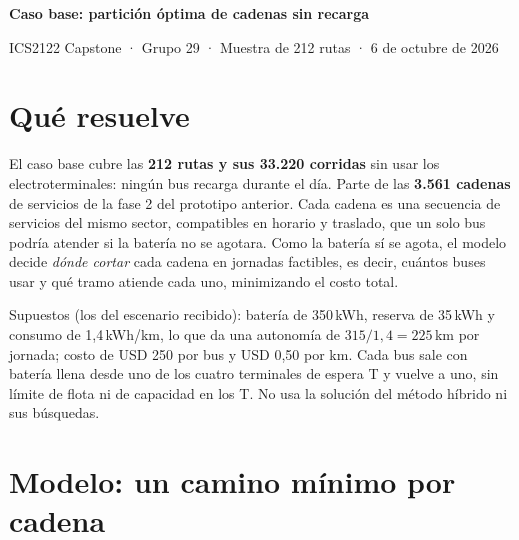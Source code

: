 \documentclass[fontsize=10.5pt,a4paper]{scrartcl}
\begin{document}
{\sffamily\color{ink}\LARGE\bfseries Caso base: partición óptima de cadenas sin recarga\par}
\vspace{2pt}
{\sffamily\small\color{slate} ICS2122 Capstone · Grupo 29 · Muestra de 212 rutas · 6 de octubre de 2026\par}
\vspace{4pt}

\section{Qué resuelve}

El caso base cubre las \textbf{212 rutas y sus 33.220 corridas} sin usar los electroterminales: ningún bus recarga durante el día. Parte de las \textbf{3.561 cadenas} de servicios de la fase 2 del prototipo anterior. Cada cadena es una secuencia de servicios del mismo sector, compatibles en horario y traslado, que un solo bus podría atender si la batería no se agotara. Como la batería sí se agota, el modelo decide \emph{dónde cortar} cada cadena en jornadas factibles, es decir, cuántos buses usar y qué tramo atiende cada uno, minimizando el costo total.

Supuestos (los del escenario recibido): batería de 350\,kWh, reserva de 35\,kWh y consumo de 1,4\,kWh/km, lo que da una autonomía de $315/1{,}4 = 225$\,km por jornada; costo de USD 250 por bus y USD 0,50 por km. Cada bus sale con batería llena desde uno de los cuatro terminales de espera T y vuelve a uno, sin límite de flota ni de capacidad en los T. No usa la solución del método híbrido ni sus búsquedas.

\section{Modelo: un camino mínimo por cadena}
\end{document}
